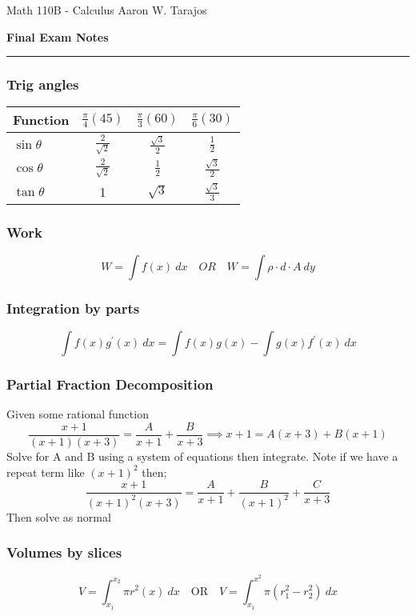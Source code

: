 \documentclass{article}
\begin{document}
\noindent
Math 110B - Calculus \hfill Aaron W. Tarajos
\begin{center}
	\textbf{Final Exam Notes}
\end{center}

\noindent\rule{\textwidth}{0.4pt}

\begin{multicols}{2}

\subsubsection*{Trig angles}
    \begin{tabular}{|l|c|c|c|}
        \hline
	Function & $\frac{\pi}{4}(45)$ & $\frac{\pi}{3}(60)$ & $\frac{\pi}{6}(30)$\\
        \hline
	$\sin \theta$ & $\frac{2}{\sqrt2}$ & $\frac{\sqrt 3}{2}$ & $\frac{1}{2}$\\
	$\cos \theta$ & $\frac{2}{\sqrt2}$ & $\frac{1}{2}$ & $\frac{\sqrt{3}}{2}$ \\
	$\tan \theta$ & 1 & $\sqrt{3}$ & $\frac{\sqrt{3}}{3}$ \\
	\hline
    \end{tabular}

\subsubsection*{Work}
\[
	W = \int f(x)\ dx \quad OR \quad W = \int \rho \cdot d \cdot A \ dy
\]

\subsubsection*{Integration by parts}
\[
	\int f(x)g^\prime(x)\ dx = \int f(x)g(x) - \int g(x)f^\prime(x)\ dx
\]

\subsubsection*{Partial Fraction Decomposition}
Given some rational function
\[
	\frac{x+1}{(x+1)(x+3)} = \frac{A}{x+1} + \frac{B}{x+3} \implies x+1 = A(x+3) + B(x+1)
\]
Solve for A and B using a system of equations then integrate. Note if we have a repeat term like $(x+1)^2$ then;
\[
	\frac{x+1}{(x+1)^2(x+3)} = \frac{A}{x+1} + \frac{B}{(x+1)^2} + \frac{C}{x+3}
\]
Then solve as normal

\subsubsection*{Volumes by slices}
\[
	V = \int_{x_1}^{x_2} \pi r^2(x)\ dx \quad \text{OR} \quad V = \int_{x_1}^{x^2} \pi \left(r_1^2 - r_2^2 \right)\ dx
\]


\end{multicols}
\end{document}
